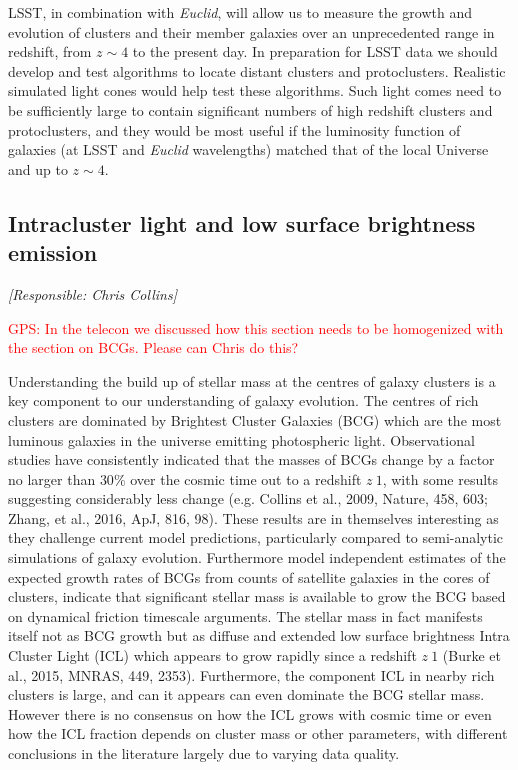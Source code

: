 \documentclass[a4paper,11pt]{article}
\newcommand{\red}{\textcolor{red}}
\begin{document}
LSST, in combination with \emph{Euclid}, 
will allow us to measure the growth and evolution of clusters and their member galaxies
over an unprecedented range in redshift, from $z\sim 4$ to
the present day. In preparation for LSST data we should develop and test algorithms to
locate distant clusters and protoclusters. Realistic simulated light
cones would help test these algorithms. Such light comes need to be
sufficiently large to contain significant numbers of high redshift
clusters and protoclusters, and they would be most useful if the
luminosity function of galaxies (at LSST and \emph{Euclid} wavelengths)
matched that of the local Universe and up to $z\sim4$.




\subsection{Intracluster light and low surface brightness emission} \label{sec:lsb}

{\it [Responsible: Chris Collins]}

\noindent\red{GPS: In the telecon we discussed how this section needs
  to be homogenized with the section on BCGs.  Please can Chris do
  this?}

\noindent
Understanding the build up of stellar mass at the centres of galaxy
clusters is a key component to our understanding of galaxy
evolution. The centres of rich clusters are dominated by Brightest
Cluster Galaxies (BCG) which are the most luminous galaxies in the
universe emitting photospheric light. Observational studies have
consistently indicated that the masses of BCGs change by a factor no
larger than $30\%$ over the cosmic time out to a redshift $ z~1$, with
some results suggesting considerably less change (e.g. Collins et al.,
2009, Nature, 458, 603; Zhang, et al., 2016, ApJ, 816, 98). These
results are in themselves interesting as they challenge current model
predictions, particularly compared to semi-analytic simulations of
galaxy evolution. Furthermore model independent estimates of the
expected growth rates of BCGs from counts of satellite galaxies in the
cores of clusters, indicate that significant stellar mass is available
to grow the BCG based on dynamical friction timescale arguments. The
stellar mass in fact manifests itself not as BCG growth but as diffuse
and extended low surface brightness Intra Cluster Light (ICL) which
appears to grow rapidly since a redshift $z~1$ (Burke et al., 2015,
MNRAS, 449, 2353). Furthermore, the component ICL in nearby rich
clusters is large, and can it appears can even dominate the BCG
stellar mass. However there is no consensus on how the ICL grows with
cosmic time or even how the ICL fraction depends on cluster mass or
other parameters, with different conclusions in the literature largely
due to varying data quality.
\end{document}
